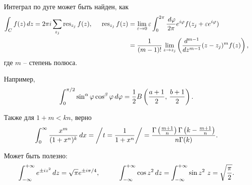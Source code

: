 
Интеграл по дуге может быть найден, как
\begin{align*}
    \int_C f(z) \, d z = 2 \pi i \sum_{z_j} \mathop{\mathrm{res}}\nolimits_{z_j} f(z),
    \hspace{5 mm} 
    \mathop{\mathrm{res}}\nolimits_{z_j} f(z) &= \lim_{\varepsilon \to 0} \varepsilon \int_0^{2\pi} \frac{\, d \varphi}{2\pi} e^{i \varphi} f(z_j + \varepsilon e^{i \varphi}) \\ 
    &= \frac{1}{(m-1)!} \lim_{z \to z_j} \left(
        \frac{d^{m-1} }{d z^{m-1}} (z-z_j)^m f(z)
    \right),
\end{align*}
где $m$ -- степень полюса. 



Например,
\begin{equation*}
    \int_0^{\pi/2} \sin^\alpha \varphi \cos^\beta \varphi \, d \varphi =  \frac{1}{2} B\left(\frac{a+1}{2},\, \frac{b+1}{2}\right).
\end{equation*}



Также для $1 + m < kn$, верно
\begin{equation*}
    \int_{0}^{\infty}  \frac{x^m}{(1+x^n)^k} \, d x = \bigg/
        t = \frac{1}{1+x^n}
    \bigg/ = \frac{\Gamma \left(\frac{m+1}{n}\right) \Gamma \left(k-\frac{m+1}{n}\right)}{n \Gamma (k)}.
\end{equation*}




Может быть полезно:
\begin{equation*}
    \int_{-\infty}^{+\infty} e^{\pm i z^2} \d z = \sqrt{\pi} e^{\pm i \pi / 4},
    \hspace{10 mm} 
    \int_{-\infty}^{+\infty} \cos z^2 \d z = \int_{-\infty}^{+\infty} \sin z^2 \ z = \sqrt{\frac{\pi}{2}}.
\end{equation*}



